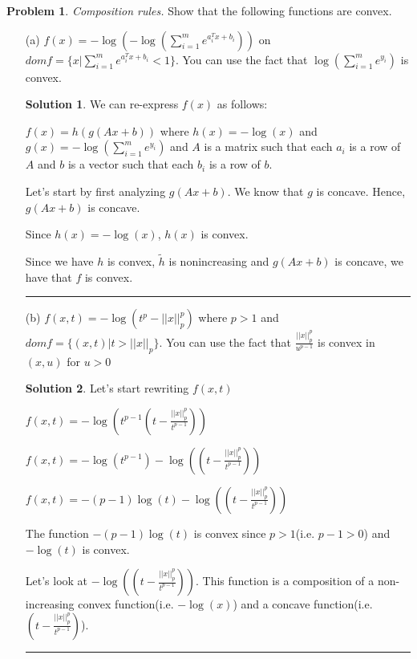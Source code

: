 \documentclass{article}
\theoremstyle{definition}
\newtheorem{problem}{Problem}
\def\fline{\rule{0.75\linewidth}{0.5pt}}
\newcommand{\finishline}{\begin{center}\fline\end{center}}
\newtheorem*{solution*}{Solution}
\newenvironment{solution}{\begin{solution*}}{{\finishline} \end{solution*}}
\begin{document}
\begin{problem}
\textit{Composition rules.} Show that the following functions are convex.

\begin{itemize}
    \item[(a)] $f(x) = -\log(-\log(\sum_{i=1}^{m} e^{a_i^Tx + b_i}))$ on $dom f = \{ x | \sum_{i=1}^{m} e^{a_i^Tx + b_i} < 1\}$. You can use the fact that $\log(\sum_{i=1}^{m} e^{y_i})$ is convex. 

    \begin{solution}
        We can re-express $f(x)$ as follows: \newline 

        $f(x) = h(g(Ax + b))$ where $h(x) = - \log(x)$ and $g(x) = -\log(\sum_{i=1}^{m} e^{y_i})$ and $A$ is a matrix such that each $a_i$ is a row of $A$ and $b$ is a vector such that each $b_i$ is a row of $b$. 

        Let's start by first analyzing $g(Ax + b)$. We know that $g$ is concave. Hence, $g(Ax + b)$ is concave. 

        Since $h(x) = - \log(x)$, $h(x)$ is convex. 

        Since we have $h$ is convex, $\tilde{h}$ is nonincreasing and $g(Ax + b)$ is concave, we have that $f$ is convex. 
    \end{solution}

    \item[(b)] $f(x, t) = -\log(t^p - ||x||^p_p)$ where $p > 1$ and $dom f = \{(x, t) | t > ||x||_p \}$. You can use the fact that $\frac{||x||^p_p}{u^{p - 1}}$ is convex in $(x, u)$ for $u > 0$

    \begin{solution}
        Let's start rewriting $f(x, t)$ \newline 

        $f(x, t) = -\log(t^{p - 1}(t - \frac{||x||^p_p}{t^{p - 1}}))$ \newline 

        $f(x, t) = -\log(t^{p - 1}) - \log((t - \frac{||x||^p_p}{t^{p - 1}}))$

        $f(x, t) = -(p - 1)\log(t) - \log((t - \frac{||x||^p_p}{t^{p - 1}}))$

        The function $-(p - 1)\log(t)$ is convex since $p > 1$(i.e. $p - 1 > 0$) and $-\log(t)$ is convex. \newline 

        Let's look at $- \log((t - \frac{||x||^p_p}{t^{p - 1}}))$. This function is a composition of a non-increasing convex function(i.e. $-\log(x)$) and a concave function(i.e. $(t - \frac{||x||^p_p}{t^{p - 1}})$). 


\end{solution}
\end{itemize}
\end{problem}
\end{document}
